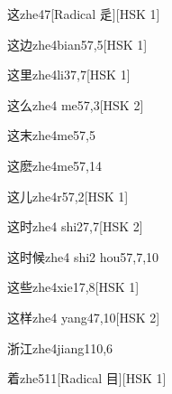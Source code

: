 \begin{entry}{这}{zhe4}{7}[Radical 辵][HSK 1]
\end{entry}

\begin{entry}{这边}{zhe4bian5}{7,5}[HSK 1]
\end{entry}

\begin{entry}{这里}{zhe4li3}{7,7}[HSK 1]
\end{entry}

\begin{entry}{这么}{zhe4 me5}{7,3}[HSK 2]
\end{entry}

\begin{entry}{这末}{zhe4me5}{7,5}
\end{entry}

\begin{entry}{这麽}{zhe4me5}{7,14}
\end{entry}

\begin{entry}{这儿}{zhe4r5}{7,2}[HSK 1]
\end{entry}

\begin{entry}{这时}{zhe4 shi2}{7,7}[HSK 2]
\end{entry}

\begin{entry}{这时候}{zhe4 shi2 hou5}{7,7,10}
\end{entry}

\begin{entry}{这些}{zhe4xie1}{7,8}[HSK 1]
\end{entry}

\begin{entry}{这样}{zhe4 yang4}{7,10}[HSK 2]
\end{entry}

\begin{entry}{浙江}{zhe4jiang1}{10,6}
\end{entry}

\begin{entry}{着}{zhe5}{11}[Radical 目][HSK 1]
\end{entry}

